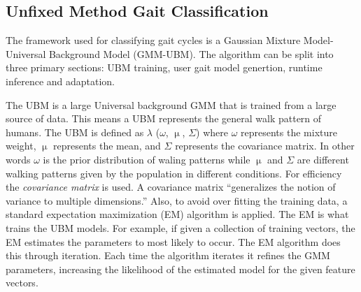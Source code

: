 \documentclass{sig-alternate}
\begin{document}
\subsection{Unfixed Method Gait Classification}
The framework used for classifying gait cycles is a Gaussian Mixture Model-Universal Background Model (GMM-UBM). The algorithm can be split into three primary sections: UBM training, user gait model genertion, runtime inference and adaptation. 

	 The UBM is a large Universal background GMM that is trained from a large source of data. This means a UBM represents the general walk pattern of humans. The UBM is defined as 
\begin{math} \lambda \end{math} (\begin{math} \omega \end{math},
\begin{math} \upmu \end{math},
\begin{math} \Sigma \end{math}) where
\begin{math} \omega \end{math} represents the mixture weight, \begin{math} \upmu \end{math} represents the mean, and \begin{math} \Sigma \end{math} represents the covariance matrix. In other words \begin{math} \omega \end{math} is the prior distribution of waling patterns while \begin{math} \upmu \end{math} and \begin{math} \Sigma \end{math} are different walking patterns given by the population in different conditions. For efficiency the \textit{covariance matrix} is used. A covariance matrix ``generalizes the notion of variance to multiple dimensions.'' Also, to avoid over fitting the training data, a standard expectation maximization (EM) algorithm is applied. The EM is what trains the UBM models. For example, if given a collection of training vectors, the EM estimates the parameters to most likely to occur. The EM algorithm does this through iteration. Each time the algorithm iterates it refines the GMM parameters, increasing the likelihood of the estimated model for the given feature vectors. 
\end{document}
